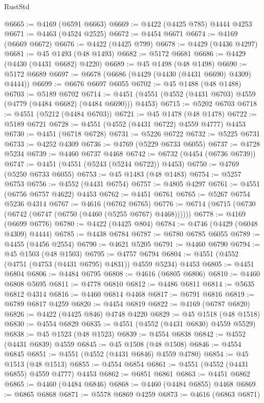 \begin{lexlean}{RustStd}
\begin{coremodule}
@6665 := @4169 (@6591 @6663)
@6669 := @4422 (@4425 @785) @4444 @4253
@6671 := @4463 (@4524 @2525)
@6672 := @4454 @6671
@6674 := @4169 (@6669 @6672)
@6676 := @4422 (@4425 @799)
@6678 := @4429 (@4436 @4297)
@6681 := @45 @1493 (@48 @1493)
@6682 := @5172 @6681
@6686 := @4429 (@4430 (@4431 @6682) @4220)
@6689 := @45 @1498 (@48 @1498)
@6690 := @5172 @6689
@6697 := @6678 (@6686 (@4429 (@4430 (@4431 @6690) @4309) @4444))
@6699 := @6676 @6697 @6055
@6702 := @45 @1488 (@48 @1488)
@6703 := @5189 @6702
@6714 := @4451 (@4551 (@4552 (@4431 @6703) @4559 (@4779 (@4484 @6682) (@4484 @6690))) @4453)
@6715 := @5202 @6703
@6718 := @4551 (@5212 (@4484 @6703))
@6721 := @45 @1478 (@48 @1478)
@6722 := @5189 @6721
@6728 := @4551 (@4552 (@4431 @6722) @4559 @4777) @4453
@6730 := @4451 (@6718 @6728)
@6731 := @5226 @6722
@6732 := @5225 @6731
@6733 := @4252 @4309
@6736 := @4769 (@5229 @6733 @6055)
@6737 := @4728 @5234
@6739 := @4460 @6737 @4468
@6742 := @6732 (@4454 (@6736 @6739))
@6747 := @4451 (@4551 (@5243 (@5244 @6722)) @4453)
@6750 := @4769 (@5250 @6733 @6055)
@6753 := @45 @1483 (@48 @1483)
@6754 := @5257 @6753
@6756 := @4552 (@4431 @6754)
@6757 := @4805 @4297
@6761 := @4551 (@6756 @6757 @4622) @4453
@6762 := @4451 @6761
@6765 := @5267 @6754 @5236 @4314
@6767 := @4616 (@6762 @6765)
@6776 := @6714 (@6715 (@6730 (@6742 (@6747 (@6750 (@4460 (@5255 @6767) @4468))))))
@6778 := @4169 (@6699 @6776)
@6780 := @4422 (@4425 @804)
@6784 := @4746 (@4429 (@6048 @4309) @4444)
@6785 := @4438 @6784
@6787 := @6780 @6785 @6055
@6789 := @4455 (@4456 @2554)
@6790 := @4621 @5205
@6791 := @4460 @6790
@6794 := @45 @1503 (@48 @1503)
@6795 := @4757 @6794
@6804 := @4551 (@4552 (@4751 (@4753 (@4431 @6795) @4831)) @4559 @5234) @4453
@6805 := @4451 @6804
@6806 := @4484 @6795
@6808 := @4616 (@6805 @6806)
@6810 := @4460 @6808 @5695
@6811 := @4778 @6810
@6812 := @4486 @6811
@6814 := @5635 @6812 @4314
@6816 := @4460 @6814 @4468
@6817 := @6791 @6816
@6819 := @6789 @6817 @4259
@6820 := @4454 @6819
@6822 := @4169 (@6787 @6820)
@6826 := @4422 (@4425 @846) @4748 @4220
@6829 := @45 @1518 (@48 @1518)
@6830 := @4554 @6829
@6835 := @4551 (@4552 (@4431 @6830) @4559 @5529)
@6838 := @45 @1523 (@48 @1523)
@6839 := @4554 @6838
@6842 := @4552 (@4431 @6839) @4559
@6845 := @45 @1508 (@48 @1508)
@6846 := @4554 @6845
@6851 := @4551 (@4552 (@4431 @6846) @4559 @4780)
@6854 := @45 @1513 (@48 @1513)
@6855 := @4554 @6854
@6861 := @4551 (@4552 (@4431 @6855) @4559 @4777) @4453
@6862 := @6851 @6861
@6863 := @4451 @6862
@6865 := @4460 (@4484 @6846)
@6868 := @4460 (@4484 @6855) @4468
@6869 := @6865 @6868
@6871 := @5578 @6869 @4259
@6873 := @4616 (@6863 @6871)

\end{coremodule}
\end{lexlean}
